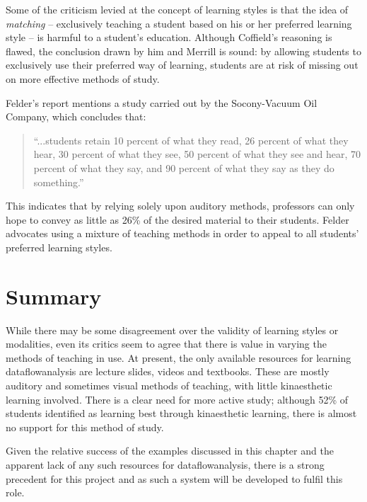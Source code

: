 \documentclass[bsc,twoside,singlespacing,parskip,logo,notimes,normalheadings]{infthesis}
\begin{document}
        Some of the criticism levied at the concept of learning styles
        is that the idea of {\em matching} -- exclusively teaching a
        student based on his or her preferred learning style -- is
        harmful to a student's education. Although Coffield's
        \cite[p. 120]{coffield2004} reasoning is flawed, the
        conclusion drawn by him and Merrill \cite[p. 4]{merrill2000}
        is sound: by allowing students to exclusively use their
        preferred way of learning, students are at risk of missing out
        on more effective methods of study.

        Felder's report mentions a study carried out by the
        Socony-Vacuum Oil Company, which concludes that:

        \begin{quote}
          ``...students retain 10 percent of what they read, 26
          percent of what they hear, 30 percent of what they see, 50
          percent of what they see and hear, 70 percent of what they
          say, and 90 percent of what they say as they do
          something.''\cite[p. 677]{felder1988}
        \end{quote}

        This indicates that by relying solely upon auditory methods,
        professors can only hope to convey as little as 26\% of the
        desired material to their students. Felder advocates using a
        mixture of teaching methods in order to appeal to all
        students' preferred learning styles.

    \section{Summary}

    While there may be some disagreement over the validity of learning
    styles or modalities, even its critics seem to agree that there is
    value in varying the methods of teaching in use. At present, the
    only available resources for learning \gls{dataflowanalysis} are
    lecture slides, videos and textbooks. These are mostly auditory
    and sometimes visual methods of teaching, with little kinaesthetic
    learning involved. There is a clear need for more active study;
    although 52\% of students identified as learning best through
    kinaesthetic learning\cite[p. 103]{mustafa2010}, there is almost
    no support for this method of study.

    Given the relative success of the examples discussed in this
    chapter and the apparent lack of any such resources for
    \gls{dataflowanalysis}, there is a strong precedent for this
    project and as such a system will be developed to fulfil this
    role.
\end{document}
